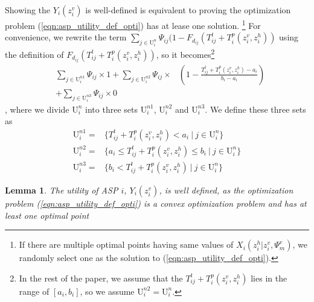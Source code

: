 \documentclass[10pt,journal, compsoc]{IEEEtran}
\newtheorem{lemma}{Lemma}
\begin{document}
Showing the $Y_i(z_i^v)$ is well-defined is equivalent to proving the optimization problem (\ref{eqn:asp_utility_def_opti}) has at lease one solution. \footnote{If there are multiple optimal points having same values of $X_i(z_i^h|z_i^v,\Psi_m^v)$, we randomly select one as the solution to (\ref{eqn:asp_utility_def_opti}).} For convenience, we rewrite the term $\sum_{j \in \mathrm{U}_i^n}\Psi_{ij}(1-F_{d_{ij}}(T_{ij}^t+T_i^p(z_i^v, z_i^h))$ using the definition of $F_{d_{ij}}(T_{ij}^t+T_i^p(z_i^v, z_i^h))$, so it becomes\footnote{In the rest of the paper, we assume that the $T_{ij}^t+T_i^p(z_i^v, z_i^h)$ lies in the range of $[a_i, b_i]$, so we assume $\mathrm{U}_i^{n2} = \mathrm{U}_i^{n}$.}
\begin{equation}
\begin{aligned}
&\sum_{j \in \mathrm{U}_i^{n1}}\Psi_{ij} \times 1 +\sum_{j \in \mathrm{U}_i^{n2}}\Psi_{ij} \times &(1-\frac{T_{ij}^t+T_i^p(z_i^v, z_i^h)-a_i}{b_i-a_i}) \\
& + \sum_{j \in \mathrm{U}_i^{n3}}\Psi_{ij} \times 0
\end{aligned}
\end{equation}
, where we divide $\mathrm{U}_i^{n}$ into three sets $\mathrm{U}_i^{n1}$, $\mathrm{U}_i^{n2}$ and $\mathrm{U}_i^{n3}$.
We define these three sets as 
\begin{subequations}\label{normal_set_user}
\begin{align}
\mathrm{U}_i^{n1} =& \{T_{ij}^t+T_i^p(z_i^v, z_i^h) < a_i\ |\ j \in \mathrm{U}_i^{n}\}\label{normal_set_user_1} \\
\mathrm{U}_i^{n2} =& \{a_i \leq T_{ij}^t+T_i^p(z_i^v, z_i^h) \leq b_i\ |\ j \in \mathrm{U}_i^{n}\}\label{normal_set_user_2} \\
\mathrm{U}_i^{n3} =& \{ b_i < T_{ij}^t+T_i^p(z_i^v, z_i^h) \ |\ j \in \mathrm{U}_i^{n}\}\label{normal_set_user_3}
\end{align}
\end{subequations}
\begin{lemma}
The utility of ASP $i$, $Y_i(z_i^v)$, is well defined, as the optimization problem (\ref{eqn:asp_utility_def_opti}) is a convex optimization problem and has at least one optimal point 
\end{lemma}
\end{document}
